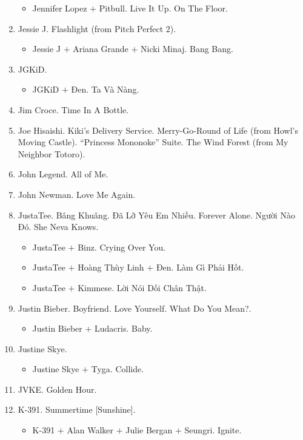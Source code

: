 \documentclass{article}
\begin{document}
\begin{enumerate}
\begin{itemize}
		\item {\sc Jennifer Lopez $+$ Pitbull.} Live It Up. On The Floor.
	\end{itemize}
	\item {\sc Jessie J.} Flashlight (from Pitch Perfect 2).
	\begin{itemize}
		\item {\sc Jessie J $+$ Ariana Grande $+$ Nicki Minaj.} Bang Bang.
	\end{itemize}
	\item {\sc JGKiD.}
	\begin{itemize}
		\item {\sc JGKiD $+$ Đen.} Ta Và Nàng.
	\end{itemize}
	\item {\sc Jim Croce.} Time In A Bottle.
	\item {\sc Joe Hisaishi.} Kiki's Delivery Service. Merry-Go-Round of Life (from Howl's Moving Castle). ``Princess Mononoke'' Suite. The Wind Forest (from My Neighbor Totoro).
	\item {\sc John Legend.} All of Me.
	\item {\sc John Newman}. Love Me Again.
	\item {\sc JustaTee.} Bâng Khuâng. Đã Lỡ Yêu Em Nhiều. Forever Alone. Người Nào Đó. She Neva Knows.
	\begin{itemize}
		\item {\sc JustaTee $+$ Binz.} Crying Over You.
		\item {\sc JustaTee $+$ Hoàng Thùy Linh $+$ Đen.} Làm Gì Phải Hốt.
		\item {\sc JustaTee $+$ Kimmese.} Lời Nói Dối Chân Thật.
	\end{itemize}
	\item {\sc Justin Bieber.} Boyfriend. Love Yourself. What Do You Mean?.
	\begin{itemize}
		\item {\sc Justin Bieber $+$ Ludacris.} Baby.
	\end{itemize}
	\item {\sc Justine Skye.}
	\begin{itemize}
		\item {\sc Justine Skye $+$ Tyga.} Collide.
	\end{itemize}
	\item{\sc JVKE.} Golden Hour.
	\item {\sc K-391.} Summertime [Sunshine].
	\begin{itemize}
		\item {\sc K-391 $+$ Alan Walker $+$ Julie Bergan $+$ Seungri.} Ignite.

\end{itemize}
\end{enumerate}
\end{document}
